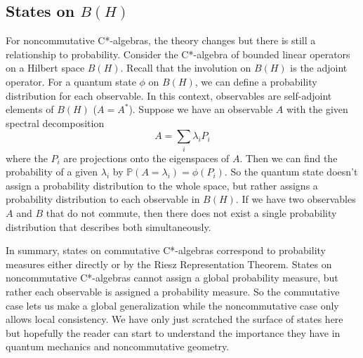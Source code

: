 \subsection{States on $B(H)$}
For noncommutative C*-algebras, the theory changes but there is still a relationship
to probability. Consider the C*-algebra of bounded linear operators on a Hilbert
space $B(H)$. Recall that  the involution on $B(H)$ is the adjoint operator. For a
quantum state $\phi$ on $B(H)$, we can define a probability distribution for each
observable. In this context, observables are self-adjoint elements of $B(H)$ ($A=A^*$).
Suppose we have an observable $A$ with the given spectral decomposition
\begin{equation}
    A = \sum_i \lambda_i P_i
\end{equation}
where the $P_i$ are projections onto the eigenspaces of $A$. Then we can find the 
probability of a given $\lambda_i$ by $\mathbb{P}(A=\lambda_i) = \phi(P_i)$. So the
quantum state doesn't assign a probability distribution to the whole space, but rather
assigns a probability distribution to each observable in $B(H)$. If we have two
observables $A$ and $B$ that do not commute, then there does not exist a single 
probability distribution that describes both simultaneously.

\par 

In summary, states on commutative C*-algebras correspond to probability measures
either directly or by the Riesz Representation Theorem. States on noncommutative
C*-algebras cannot assign a global probability measure, but rather each observable
is assigned a probability measure. So the commutative case lets us make a global
generalization while the noncommutative case only allows local consistency. We have
only just scratched the surface of states here but hopefully the reader can start
to understand the importance they have in quantum mechanics and noncommutative geometry.

